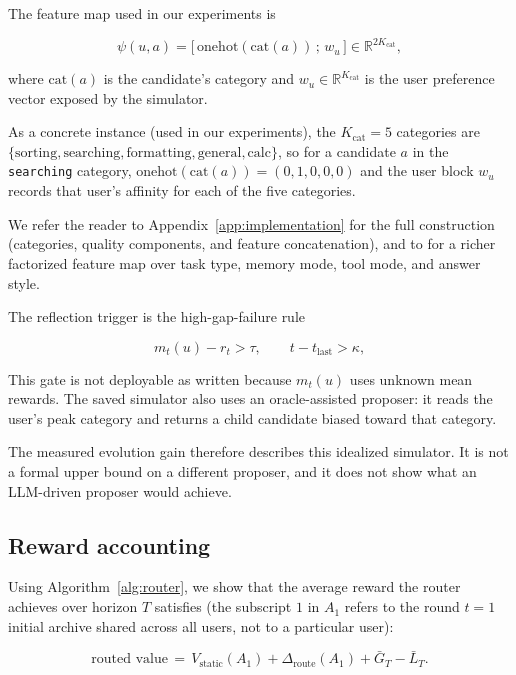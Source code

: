 \documentclass{article} %
\begin{document}
The feature map used in our experiments is

\begin{equation}
\label{eq:method-feat}
\psi(u,a) = \big[\,\mathrm{onehot}(\mathrm{cat}(a))\,;\, w_u\,\big] \in \mathbb{R}^{2K_{\mathrm{cat}}},
\end{equation}

where $\mathrm{cat}(a)$ is the candidate's category and $w_u \in \mathbb{R}^{K_{\mathrm{cat}}}$ is the user preference vector exposed by the simulator.

As a concrete instance (used in our experiments), the $K_{\mathrm{cat}}=5$ categories are $\{\text{sorting}, \text{searching}, \text{formatting}, \text{general}, \text{calc}\}$, so for a candidate $a$ in the \texttt{searching} category, $\mathrm{onehot}(\mathrm{cat}(a))=(0,1,0,0,0)$ and the user block $w_u$ records that user's affinity for each of the five categories.

We refer the reader to Appendix~\ref{app:implementation} for the full construction (categories, quality components, and feature concatenation), and to \citet{jin2026personalizing} for a richer factorized feature map over task type, memory mode, tool mode, and answer style.

The reflection trigger is the high-gap-failure rule

\begin{equation}
\label{eq:method-trigger}
m_t(u) - r_t > \tau,\qquad t - t_{\mathrm{last}} > \kappa,
\end{equation}

This gate is not deployable as written because $m_t(u)$ uses unknown mean rewards. The saved simulator also uses an oracle-assisted proposer: it reads the user's peak category and returns a child candidate biased toward that category.

The measured evolution gain therefore describes this idealized simulator. It is not a formal upper bound on a different proposer, and it does not show what an LLM-driven proposer would achieve.

\subsection{Reward accounting}
Using Algorithm~\ref{alg:router}, we show that the average reward the router achieves over horizon $T$ satisfies (the subscript $1$ in $A_1$ refers to the round $t=1$ initial archive shared across all users, not to a particular user):

\begin{equation}
\label{eq:method-thesis}
\text{routed value}
\,=\, V_{\mathrm{static}}(A_1) + \Delta_{\mathrm{route}}(A_1) + \bar G_T - \bar L_T.
\end{equation}
\end{document}
